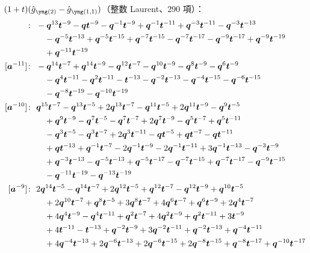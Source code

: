 $(1 + t)(\hat g_{\ytwo} - \hat g_{\yoneone})$（整数 Laurent、290 項）：
\begin{align*}
[\ba^{-12}]\colon\ & -\bq^{13} \bt^{-9} -\bq \bt^{-9} -\bq^{-1} \bt^{-9} +\bq^{-1} \bt^{-11} +\bq^{-3} \bt^{-11} -\bq^{-3} \bt^{-13} \\
& \quad -\bq^{-5} \bt^{-13} +\bq^{-5} \bt^{-15} +\bq^{-7} \bt^{-15} -\bq^{-7} \bt^{-17} -\bq^{-9} \bt^{-17} +\bq^{-9} \bt^{-19} \\
& \quad +\bq^{-11} \bt^{-19} \\
[\ba^{-11}]\colon\ & -\bq^{14} \bt^{-7} +\bq^{14} \bt^{-9} -\bq^{12} \bt^{-7} -\bq^{10} \bt^{-9} -\bq^{8} \bt^{-9} -\bq^{6} \bt^{-9} \\
& \quad -\bq^{4} \bt^{-11} -\bq^{2} \bt^{-11} -\bt^{-13} -\bq^{-2} \bt^{-13} -\bq^{-4} \bt^{-15} -\bq^{-6} \bt^{-15} \\
& \quad -\bq^{-8} \bt^{-19} -\bq^{-10} \bt^{-19} \\
[\ba^{-10}]\colon\ & \bq^{15} \bt^{-7} -\bq^{13} \bt^{-5} +2 \bq^{13} \bt^{-7} -\bq^{11} \bt^{-5} +2 \bq^{11} \bt^{-9} -\bq^{9} \bt^{-5} \\
& \quad +\bq^{9} \bt^{-9} -\bq^{7} \bt^{-5} -\bq^{7} \bt^{-7} +2 \bq^{7} \bt^{-9} -\bq^{5} \bt^{-7} +\bq^{5} \bt^{-11} \\
& \quad -\bq^{3} \bt^{-5} -\bq^{3} \bt^{-7} +2 \bq^{3} \bt^{-11} -\bq \bt^{-5} +\bq \bt^{-7} -\bq \bt^{-11} \\
& \quad +\bq \bt^{-13} +\bq^{-1} \bt^{-7} -2 \bq^{-1} \bt^{-9} -2 \bq^{-1} \bt^{-11} +3 \bq^{-1} \bt^{-13} -\bq^{-3} \bt^{-9} \\
& \quad +\bq^{-3} \bt^{-13} -\bq^{-5} \bt^{-13} +\bq^{-5} \bt^{-17} -\bq^{-7} \bt^{-15} +\bq^{-7} \bt^{-17} -\bq^{-9} \bt^{-15} \\
& \quad -\bq^{-11} \bt^{-19} -\bq^{-13} \bt^{-19} \\
[\ba^{-9}]\colon\ & 2 \bq^{14} \bt^{-5} -\bq^{14} \bt^{-7} +2 \bq^{12} \bt^{-5} +\bq^{12} \bt^{-7} -\bq^{12} \bt^{-9} +\bq^{10} \bt^{-5} \\
& \quad +2 \bq^{10} \bt^{-7} +\bq^{8} \bt^{-5} +3 \bq^{8} \bt^{-7} +4 \bq^{6} \bt^{-7} +\bq^{6} \bt^{-9} +2 \bq^{4} \bt^{-7} \\
& \quad +4 \bq^{4} \bt^{-9} -\bq^{4} \bt^{-11} +\bq^{2} \bt^{-7} +4 \bq^{2} \bt^{-9} +\bq^{2} \bt^{-11} +3 \bt^{-9} \\
& \quad +4 \bt^{-11} -\bt^{-13} +\bq^{-2} \bt^{-9} +3 \bq^{-2} \bt^{-11} +\bq^{-2} \bt^{-13} +\bq^{-4} \bt^{-11} \\
& \quad +4 \bq^{-4} \bt^{-13} +2 \bq^{-6} \bt^{-13} +2 \bq^{-6} \bt^{-15} +2 \bq^{-8} \bt^{-15} +\bq^{-8} \bt^{-17} +\bq^{-10} \bt^{-17} \\

\end{align*}
